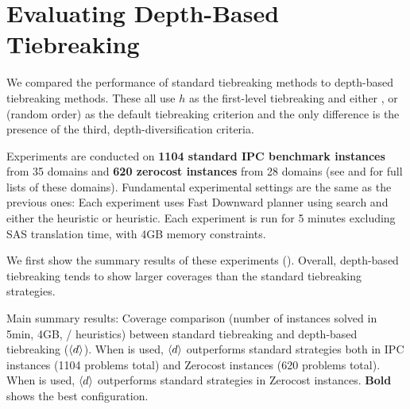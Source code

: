 \section{Evaluating Depth-Based Tiebreaking}
\label{sec:depth-based-evaluation}



We compared the performance of standard tiebreaking methods to depth-based tiebreaking methods. These all use $h$
as the first-level tiebreaking and either \fifo, \lifo or \ro (random order) as the default tiebreaking criterion
and the only difference is the presence of the third, depth-diversification criteria.

Experiments are conducted on \textbf{1104 standard IPC benchmark
instances} from 35 domains  and \textbf{620 zerocost instances} from 28 domains (see  and  for full lists of these domains). 
Fundamental experimental settings are the same as the previous ones:
Each experiment uses Fast Downward planner using \astar search and either the \lmcut heuristic or \mands heuristic.
Each experiment is run for 5 minutes excluding SAS translation time, with 4GB memory constraints.

We first show the summary results of these experiments ().
Overall, depth-based tiebreaking tends to show larger coverages than the
standard tiebreaking strategies.

\begin{table}[htb]
 {
 \centering
 \setlength{\tabcolsep}{3pt}
 
 \caption{
 Main summary results: Coverage comparison (number of instances solved in 5min, 4GB, \lmcut/\mands
 heuristics) between standard tiebreaking and depth-based tiebreaking
 (${\left<d\right>}$). When \lmcut is used, ${\left<d\right>}$ outperforms standard strategies both in IPC
 instances (1104 problems total) and Zerocost instances (620 problems
 total). When \mands is used, ${\left<d\right>}$ outperforms standard strategies
 in Zerocost instances. \textbf{Bold} shows the best configuration.}
 \label{tbl:depth-summary}
 }
\end{table}

